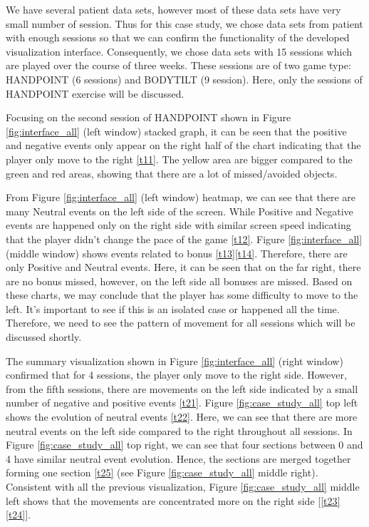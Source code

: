 \documentclass{vgtc}                          %
\begin{document}
We have several patient data sets, however most of these data sets have very small number of session. Thus for this case study, we chose data sets from patient with enough sessions so that we can confirm the functionality of the developed visualization interface. Consequently, we chose data sets with 15 sessions which are played over the course of three weeks. These sessions are of two game type: HANDPOINT (6 sessions) and BODYTILT (9 session). Here, only the sessions of HANDPOINT exercise will be discussed. 

Focusing on the second session of HANDPOINT shown in Figure \ref{fig:interface_all} (left window) stacked graph, it can be seen that the positive and negative events only appear on the right half of the chart indicating that the player only move to the right \ref{t11}. The yellow area are bigger compared to the green and red areas, showing that there are a lot of missed/avoided objects. 

From Figure \ref{fig:interface_all} (left window) heatmap, we can see that there are many Neutral events on the left side of the screen. While Positive and Negative events are happened only on the right side with similar screen speed indicating that the player didn't change the pace of the game \ref{t12}. Figure \ref{fig:interface_all} (middle window) shows events related to bonus \ref{t13}\ref{t14}. Therefore, there are only Positive and Neutral events. Here, it can be seen that on the far right, there are no bonus missed, however, on the left side all bonuses are missed. Based on these charts, we may conclude that the player has some difficulty to move to the left. It's important to see if this is an isolated case or happened all the time. Therefore, we need to see the pattern of movement for all sessions which will be discussed shortly.

The summary visualization shown in Figure \ref{fig:interface_all} (right window) confirmed that for 4 sessions, the player only move to the right side. However, from the fifth sessions, there are movements on the left side indicated by a small number of negative and positive events \ref{t21}. Figure \ref{fig:case_study_all} top left shows the evolution of neutral events \ref{t22}. Here, we can see that there are more neutral events on the left side compared to the right throughout all sessions. In Figure \ref{fig:case_study_all} top right, we can see that four sections between 0 and 4 have similar neutral event evolution. Hence, the sections are merged together forming one section \ref{t25} (see Figure \ref{fig:case_study_all} middle right). Consistent with all the previous visualization, Figure \ref{fig:case_study_all} middle left shows that the movements are concentrated more on the right side [\ref{t23}\ref{t24}].
\end{document}
